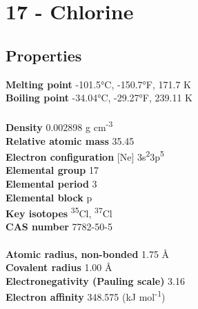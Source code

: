 \section{17 - Chlorine}
\label{sec:elem-chlorine}
\subsection{Properties}
\textbf{Melting point} -101.5°C, -150.7°F, 171.7 K\\
\textbf{Boiling point} -34.04°C, -29.27°F, 239.11 K\\
\\
\textbf{Density} 0.002898 g cm\textsuperscript{-3}\\
\textbf{Relative atomic mass} 35.45\\
\textbf{Electron configuration} [Ne] 3s\textsuperscript{2}3p\textsuperscript{5}\\
\textbf{Elemental group} 17\\
\textbf{Elemental period} 3\\
\textbf{Elemental block} p\\
\textbf{Key isotopes} \textsuperscript{35}Cl, \textsuperscript{37}Cl\\
\textbf{CAS number} 7782-50-5\\
\\
\textbf{Atomic radius, non-bonded} 1.75 Å\\
\textbf{Covalent radius} 1.00 Å\\
\textbf{Electronegativity (Pauling scale)} 3.16\\
\textbf{Electron affinity} 348.575 (kJ mol\textsuperscript{-1})\\